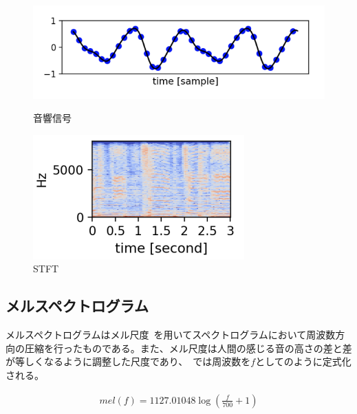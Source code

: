 \begin{figure}[b]
\centering
\begin{minipage}[b]{0.48\columnwidth}
\centering
\includegraphics[width=\columnwidth]{figure/audio_signal.png}
\caption{音響信号}
\label{fig:audio_signal}
\end{minipage}
\begin{minipage}[b]{0.48\columnwidth}
\centering
\includegraphics[width=\columnwidth]{figure/stft.png}
\caption{STFT}
\label{fig:STFT}
\end{minipage}
\end{figure}
    

\clearpage

\subsection{メルスペクトログラム}

メルスペクトログラムはメル尺度~\cite{melscale}を用いてスペクトログラムにおいて周波数方向の圧縮を行ったものである。また、メル尺度は人間の感じる音の高さの差と差が等しくなるように調整した尺度であり、~\cite{mel}では周波数を$f$としてのように定式化される。

\begin{align}
    \label{eq:mel}
    mel(f)=1127.01048\log{(\frac{f}{700}+1)}
\end{align}

